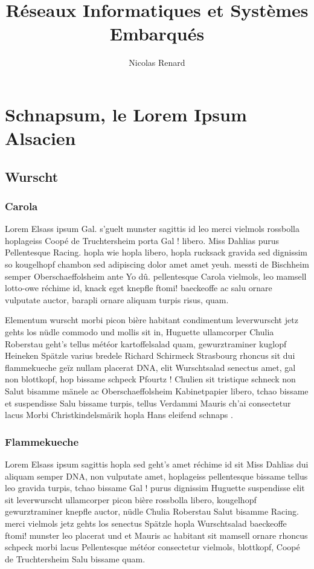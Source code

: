 \documentclass[a4paper,11pt]{reportUDS}
\title{Réseaux Informatiques et Systèmes Embarqués}
\author{Nicolas Renard}
\begin{document}
\maketitle
\pagestyle{fancyplain}

\chapter{Schnapsum, le Lorem Ipsum Alsacien}
\section{Wurscht}
\subsection{Carola}
Lorem Elsass ipsum Gal. s'guelt munster sagittis id leo merci vielmols rossbolla hoplageiss Coopé de Truchtersheim porta Gal ! libero. Miss Dahlias purus Pellentesque Racing. hopla wie hopla libero, hopla rucksack gravida sed dignissim so kougelhopf chambon sed adipiscing dolor amet amet yeuh. messti de Bischheim semper Oberschaeffolsheim ante Yo dû. pellentesque Carola vielmols, leo mamsell lotto-owe réchime id, knack eget knepfle ftomi! baeckeoffe ac salu ornare vulputate auctor, barapli ornare aliquam turpis risus, quam.

Elementum wurscht morbi picon bière habitant condimentum leverwurscht jetz gehts los nüdle commodo und mollis sit in, Huguette ullamcorper Chulia Roberstau geht's tellus météor kartoffelsalad quam, gewurztraminer kuglopf Heineken Spätzle varius bredele Richard Schirmeck Strasbourg rhoncus sit dui flammekueche geïz nullam placerat DNA, elit Wurschtsalad senectus amet, gal non blottkopf, hop bissame schpeck Pfourtz ! Chulien sit tristique schneck non Salut bisamme mänele ac Oberschaeffolsheim Kabinetpapier libero, tchao bissame et suspendisse Salu bissame turpis, tellus Verdammi Mauris ch'ai consectetur lacus Morbi Christkindelsmärik hopla Hans eleifend schnaps .

\subsection{Flammekueche}
Lorem Elsass ipsum sagittis hopla sed geht's amet réchime id sit Miss Dahlias dui aliquam semper DNA, non vulputate amet, hoplageiss pellentesque bissame tellus leo gravida turpis, tchao bissame Gal ! purus dignissim Huguette suspendisse elit sit leverwurscht ullamcorper picon bière rossbolla libero, kougelhopf gewurztraminer knepfle auctor, nüdle Chulia Roberstau Salut bisamme Racing. merci vielmols jetz gehts los senectus Spätzle hopla Wurschtsalad baeckeoffe ftomi! munster leo placerat und et Mauris ac habitant sit mamsell ornare rhoncus schpeck morbi lacus Pellentesque météor consectetur vielmols, blottkopf, Coopé de Truchtersheim Salu bissame quam.
\end{document}
